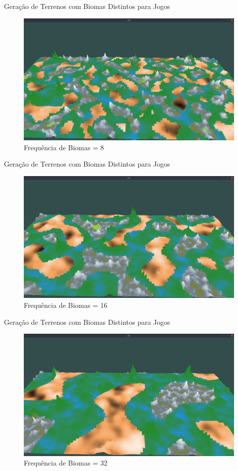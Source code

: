 \begin{frame}{Geração de Terrenos com Biomas Distintos para Jogos}
  \begin{figure}
		\centering
        \includegraphics[width=.8\textwidth]{img/uffs/8b32.png}
        \caption{Frequência de Biomas = 8}
  \end{figure}
\end{frame}

\begin{frame}{Geração de Terrenos com Biomas Distintos para Jogos}
  \begin{figure}
		\centering
        \includegraphics[width=.8\textwidth]{img/uffs/16b32.png}
        \caption{Frequência de Biomas = 16}
  \end{figure}
\end{frame}

\begin{frame}{Geração de Terrenos com Biomas Distintos para Jogos}
  \begin{figure}
		\centering
        \includegraphics[width=.8\textwidth]{img/uffs/32b32.png}
        \caption{Frequência de Biomas = 32}
  \end{figure}
\end{frame}


